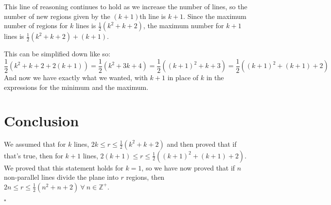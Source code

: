 \documentclass[a4paper]{article}
\newcommand{\half}{\frac{1}{2}}
\newcommand{\hexpr}[1]{\half(#1^2 + #1 + 2)}
\begin{document}
\begin{center}
\end{center}

This line of reasoning continues to hold as we increase the number of lines, so the number of new regions given by the $(k + 1)$th line is $k + 1$. Since the maximum number of regions for $k$ lines is $\half(k^2 + k + 2)$, the maximum number for $k + 1$ lines is $\hexpr{k} + (k + 1)$.

This can be simplified down like so: \[\half(k^2 + k + 2 + 2(k + 1)) = \half(k^2 + 3k + 4) = \half((k + 1)^2 + k + 3) = \hexpr{(k + 1)}\] And now we have exactly what we wanted, with $k + 1$ in place of $k$ in the expressions for the minimum and the maximum.

\section{Conclusion}

We assumed that for $k$ lines, $2k \leq r \leq \hexpr{k}$ and then proved that if that's true, then for $k + 1$ lines, $2(k + 1) \leq r \leq \hexpr{(k + 1)}$. We proved that this statement holds for $k = 1$, so we have now proved that if $n$ non-parallel lines divide the plane into $r$ regions, then $2n \leq r \leq \hexpr{n}\ \forall\ n \in \mathbb{Z}^+$.

\hspace{\fill}$\square$
\end{document}
